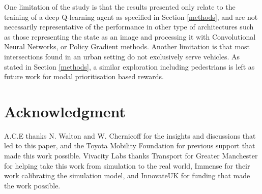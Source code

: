 \documentclass{article}
\begin{document}
One limitation of the study is that the results presented only relate to the training of a deep Q-learning agent as specified in Section \ref{methods}, and are not necessarily representative of the performance in other type of architectures such as those representing the state as an image and processing it with Convolutional Neural Networks, or Policy Gradient methods.
Another limitation is that most intersections found in an urban setting do not exclusively serve vehicles. As stated in Section \ref{methods}, a similar exploration including pedestrians is left as future work for modal prioritisation based rewards.

\section*{Acknowledgment}
A.C.E thanks N. Walton and W. Chernicoff for the insights and discussions that led to this paper, and the Toyota Mobility Foundation for previous support that made this work possible. Vivacity Labs thanks Transport for Greater Manchester for helping take this work from simulation to the real world, Immense for their work calibrating the simulation model, and InnovateUK for funding that made the work possible.

\end{document}
